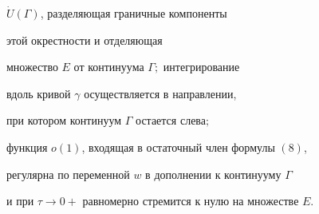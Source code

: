 \begin{thm}
$\Dot{U}(\Gamma)$, разделяющая граничные компоненты


этой окрестности и отделяющая 


множество $E$ от континуума $\Gamma;$ интегрирование


вдоль кривой $\gamma$ осуществляется в направлении, 


при котором континуум $\Gamma$ остается слева$;$


функция $o(1)$, входящая в остаточный член формулы $(8)$,


регулярна по переменной $w$ в дополнении к континууму $\Gamma$


и при $\tau\to 0+$ равномерно стремится к нулю на множестве $E$.


\end{thm}





